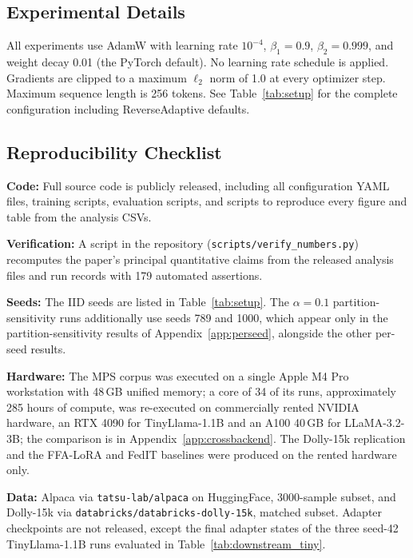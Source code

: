 \documentclass[iicol,pdflatex,sn-mathphys-num]{sn-jnl}
\begin{document}
\begin{appendices}
\makeatletter
{}%
%
\makeatother
\section{Experimental Details}
\label{app:hyper}
All experiments use AdamW \cite{loshchilov2019decoupled} with learning rate $10^{-4}$, $\beta_1{=}0.9$, $\beta_2{=}0.999$, and weight decay 0.01 (the PyTorch default). No learning rate schedule is applied. Gradients are clipped to a maximum $\ell_2$ norm of 1.0 at every optimizer step. Maximum sequence length is 256 tokens. See Table~\ref{tab:setup} for the complete configuration including ReverseAdaptive defaults.

\subsection{Reproducibility Checklist}
\label{app:repro}
\textbf{Code:} Full source code is publicly released, including all configuration YAML files, training scripts, evaluation scripts, and scripts to reproduce every figure and table from the analysis CSVs.

\textbf{Verification:} A script in the repository (\texttt{scripts/verify\_numbers.py}) recomputes the paper's principal quantitative claims from the released analysis files and run records with 179 automated assertions.

\textbf{Seeds:} The IID seeds are listed in Table~\ref{tab:setup}. The $\alpha{=}0.1$ partition-sensitivity runs additionally use seeds 789 and 1000, which appear only in the partition-sensitivity results of Appendix~\ref{app:perseed}, alongside the other per-seed results.

\textbf{Hardware:} The MPS corpus was executed on a single Apple M4 Pro workstation with 48\,GB unified memory; a core of 34 of its runs, approximately 285 hours of compute, was re-executed on commercially rented NVIDIA hardware, an RTX 4090 for TinyLlama-1.1B and an A100 40\,GB for LLaMA-3.2-3B; the comparison is in Appendix~\ref{app:crossbackend}. The Dolly-15k replication and the FFA-LoRA and FedIT baselines were produced on the rented hardware only.

\textbf{Data:} Alpaca \cite{taori2023alpaca} via \texttt{tatsu-lab/alpaca} on HuggingFace, 3000-sample subset, and Dolly-15k \cite{dolly2023} via \texttt{databricks/databricks-dolly-15k}, matched subset. Adapter checkpoints are not released, except the final adapter states of the three seed-42 TinyLlama-1.1B runs evaluated in Table~\ref{tab:downstream_tiny}.


\end{appendices}
\end{document}
